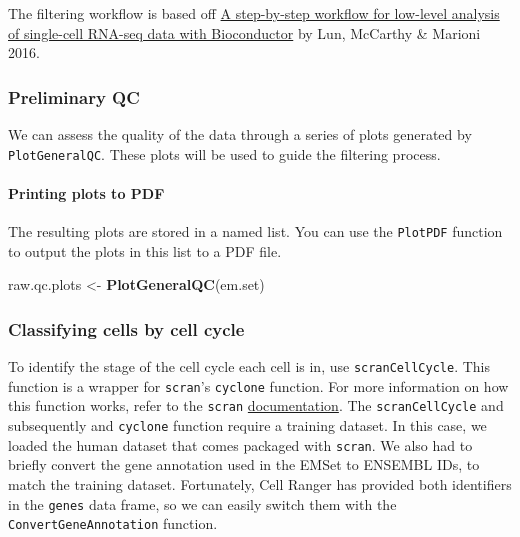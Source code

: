 \documentclass[]{article}
\newenvironment{Shaded}{\begin{snugshade}}{\end{snugshade}}
\newcommand{\KeywordTok}[1]{\textcolor[rgb]{0.13,0.29,0.53}{\textbf{#1}}}
\newcommand{\NormalTok}[1]{#1}
\newcommand{\StringTok}[1]{\textcolor[rgb]{0.31,0.60,0.02}{#1}}
\let\oldparagraph\paragraph
\renewcommand{\paragraph}[1]{\oldparagraph{#1}\mbox{}}
\begin{document}
The filtering workflow is based off
\href{https://f1000research.com/articles/5-2122/v2}{A step-by-step
workflow for low-level analysis of single-cell RNA-seq data with
Bioconductor} by Lun, McCarthy \& Marioni 2016.

\hypertarget{preliminary-qc}{%
\subsubsection{Preliminary QC}\label{preliminary-qc}}

We can assess the quality of the data through a series of plots
generated by \texttt{PlotGeneralQC}. These plots will be used to guide
the filtering process.

\hypertarget{printing-plots-to-pdf}{%
\paragraph{Printing plots to PDF}\label{printing-plots-to-pdf}}

The resulting plots are stored in a named list. You can use the
\texttt{PlotPDF} function to output the plots in this list to a PDF
file.

\begin{Shaded}
\begin{Highlighting}[]
\NormalTok{raw.qc.plots <-}\StringTok{ }\KeywordTok{PlotGeneralQC}\NormalTok{(em.set)}
\end{Highlighting}
\end{Shaded}

\hypertarget{classifying-cells-by-cell-cycle}{%
\subsubsection{Classifying cells by cell
cycle}\label{classifying-cells-by-cell-cycle}}

To identify the stage of the cell cycle each cell is in, use
\texttt{scranCellCycle}. This function is a wrapper for \texttt{scran}'s
\texttt{cyclone} function. For more information on how this function
works, refer to the \texttt{scran}
\href{https://f1000research.com/articles/5-2122/v2}{documentation}. The
\texttt{scranCellCycle} and subsequently and \texttt{cyclone} function
require a training dataset. In this case, we loaded the human dataset
that comes packaged with \texttt{scran}. We also had to briefly convert
the gene annotation used in the EMSet to ENSEMBL IDs, to match the
training dataset. Fortunately, Cell Ranger has provided both identifiers
in the \texttt{genes} data frame, so we can easily switch them with the
\texttt{ConvertGeneAnnotation} function.
\end{document}
